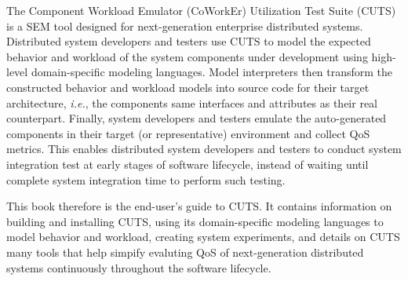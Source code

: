The Component Workload Emulator (CoWorkEr) Utilization Test Suite (CUTS)  
is a SEM tool designed for next-generation enterprise distributed 
systems. Distributed system developers and testers use CUTS to model the expected behavior 
and workload of the system components under development using high-level
domain-specific modeling languages. Model interpreters then transform the 
constructed behavior and workload models into source code for their target 
architecture, \textit{i.e.}, the components same interfaces and attributes as 
their real counterpart. Finally, system developers and testers emulate the 
auto-generated components in their target (or representative) environment
and collect QoS metrics. This enables distributed system developers and testers
to conduct system integration test at early stages of software lifecycle,
instead of waiting until complete system integration time to perform such
testing.

\iffalse
Developers and testers can grapically view the collected metrics while the system 
is executing to understand its current performance, and gain insight on how to 
improve it. Developer also have the option of viewing and analyzing collected 
performance metrics postmortem. Lastly, as the real component's implementation 
is completed, it can replace its respective emulation component to produce more 
realistic results and facilitate continuous system integration.
\fi

This book therefore is the end-user's guide to CUTS. It contains information on 
building and installing CUTS, using its domain-specific modeling languages to model
behavior and workload, creating system experiments, and details on CUTS many tools 
that help simpify evaluting QoS of next-generation distributed systems continuously
throughout the software lifecycle.

